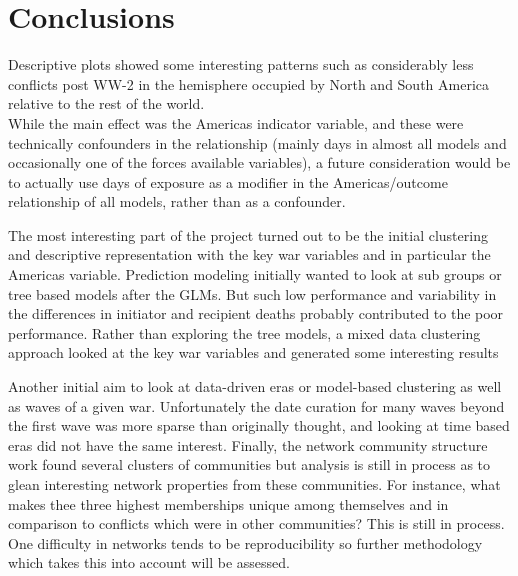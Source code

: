 \documentclass[
]{article}
\begin{document}
\hypertarget{conclusions}{%
\section{Conclusions}\label{conclusions}}

Descriptive plots showed some interesting patterns such as considerably
less conflicts post WW-2 in the hemisphere occupied by North and South
America relative to the rest of the world.\\

While the main effect was the Americas indicator variable, and these
were technically confounders in the relationship (mainly days in almost
all models and occasionally one of the forces available variables), a
future consideration would be to actually use days of exposure as a
modifier in the Americas/outcome relationship of all models, rather than
as a confounder.

The most interesting part of the project turned out to be the initial
clustering and descriptive representation with the key war variables and
in particular the Americas variable. Prediction modeling initially
wanted to look at sub groups or tree based models after the GLMs. But
such low performance and variability in the differences in initiator and
recipient deaths probably contributed to the poor performance. Rather
than exploring the tree models, a mixed data clustering approach looked
at the key war variables and generated some interesting results

Another initial aim to look at data-driven eras or model-based
clustering as well as waves of a given war. Unfortunately the date
curation for many waves beyond the first wave was more sparse than
originally thought, and looking at time based eras did not have the same
interest. Finally, the network community structure work found several
clusters of communities but analysis is still in process as to glean
interesting network properties from these communities. For instance,
what makes thee three highest memberships unique among themselves and in
comparison to conflicts which were in other communities? This is still
in process. One difficulty in networks tends to be reproducibility so
further methodology which takes this into account will be assessed.
\end{document}
